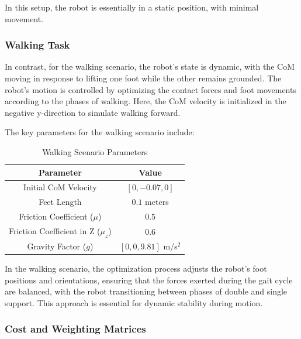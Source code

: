 \documentclass[main.tex]{subfiles}
\begin{document}
In this setup, the robot is essentially in a static position, with minimal movement. 

\subsubsection*{Walking Task}

In contrast, for the walking scenario, the robot's state is dynamic, with the CoM moving in response to lifting one foot while the other remains grounded. The robot's motion is controlled by optimizing the contact forces and foot movements according to the phases of walking. Here, the CoM velocity is initialized in the negative y-direction to simulate walking forward.

The key parameters for the walking scenario include:

\begin{table}[htbp]
\centering
\renewcommand{\arraystretch}{1.5} %
\begin{tabular}{|c|c|}
\hline
\textbf{Parameter} & \textbf{Value} \\ \hline
Initial CoM Velocity & \([0, -0.07, 0]\) \\ \hline
Feet Length & \(0.1\) meters \\ \hline
Friction Coefficient (\(\mu\)) & \(0.5\) \\ \hline
Friction Coefficient in Z (\(\mu_z\)) & \(0.6\) \\ \hline
Gravity Factor (\(g\)) & \([0, 0, 9.81]\) m/s\(^2\) \\ \hline
\end{tabular}
\caption{Walking Scenario Parameters}
\label{tab:walking_parameters}
\end{table}

In the walking scenario, the optimization process adjusts the robot's foot positions and orientations, ensuring that the forces exerted during the gait cycle are balanced, with the robot transitioning between phases of double and single support. This approach is essential for dynamic stability during motion.

\subsubsection*{Cost and Weighting Matrices}
\end{document}
